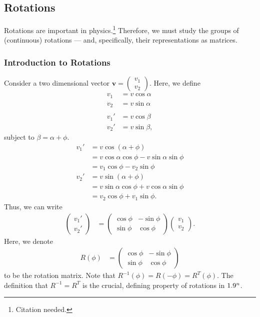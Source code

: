 \documentclass[10pt]{mypackage}
\begin{document}
\subsection{Rotations}%
Rotations are important in physics.\footnote{Citation needed.} Therefore, we must study the groups of (continuous) rotations --- and, specifically, their representations as matrices.
\subsubsection{Introduction to Rotations}%
Consider a two dimensional vector $\mathbf{v} = \begin{pmatrix}v_1\\v_2\end{pmatrix}$. Here, we define
\begin{align*}
  v_{1} &= v\cos\alpha\\
  v_2 &= v\sin\alpha\\
  \\
  v_1' &= v\cos\beta\\
  v_2' &= v\sin\beta,
\end{align*}
subject to $\beta = \alpha + \phi$.
\begin{align*}
  v_1' &= v \cos\left(\alpha + \phi\right)\\
       &= v\cos\alpha\cos\phi - v\sin\alpha\sin\phi\\
       &= v_1\cos\phi - v_2\sin\phi\\
  v_2' &= v\sin\left(\alpha + \phi\right)\\
       &= v\sin\alpha\cos\phi + v\cos\alpha\sin\phi\\
       &= v_2\cos\phi + v_1\sin\phi.
\end{align*}
Thus, we can write
\begin{align*}
  \begin{pmatrix}v_1'\\v_2'\end{pmatrix} &= \begin{pmatrix}\cos\phi & -\sin\phi \\ \sin\phi & \cos\phi\end{pmatrix} \begin{pmatrix}v_1\\v_2\end{pmatrix}.
\end{align*}
Here, we denote
\begin{align*}
  R\left(\phi\right) &= \begin{pmatrix}\cos\phi & -\sin\phi\\ \sin\phi & \cos\phi\end{pmatrix}
\end{align*}
to be the rotation matrix. Note that $R^{-1}\left(\phi\right) = R\left(-\phi\right) = R^{T}\left(\phi\right)$. The definition that $R^{-1} = R^{T}$ is the crucial, defining property of rotations in $1.9^n$.\newline
\end{document}
